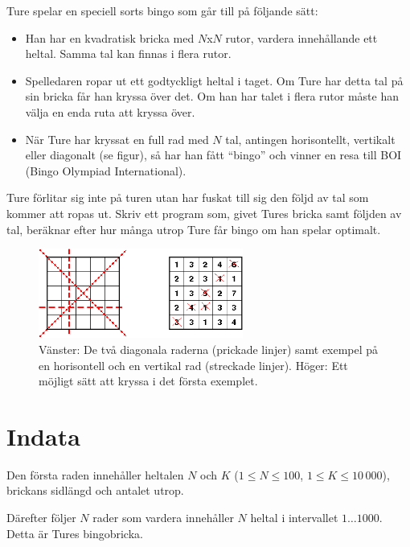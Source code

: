 
Ture spelar en speciell sorts bingo som går till på följande sätt:
\begin{itemize}
\item Han har en kvadratisk bricka med $N$x$N$ rutor, vardera innehållande ett heltal. Samma tal kan finnas i flera rutor.
\item Spelledaren ropar ut ett godtyckligt heltal i taget. Om Ture har detta tal på sin bricka får han kryssa över det. Om han har talet i flera rutor måste han välja en enda ruta att kryssa över.
\item När Ture har kryssat en full rad med $N$ tal, antingen horisontellt, vertikalt eller diagonalt (se figur), så har han fått ``bingo'' och vinner en resa till BOI (Bingo Olympiad International).
\end{itemize}

Ture förlitar sig inte på turen utan har fuskat till sig den följd av tal som kommer att ropas ut. Skriv ett program som, givet Tures bricka samt följden av tal, beräknar efter hur många utrop Ture får bingo om han spelar optimalt.

\begin{figure}[!h]
\begin{center}
\includegraphics[width=0.6\textwidth]{bingo.png}
\end{center}
\caption{Vänster: De två diagonala raderna (prickade linjer) samt
  exempel på en horisontell och en vertikal rad (streckade
  linjer). Höger: Ett möjligt sätt att kryssa i det första exemplet.}
\end{figure}



\section*{Indata}
Den första raden innehåller heltalen $N$ och $K$ ($1\leq N \leq 100$, $1 \leq K \leq 10\,000$), brickans
sidlängd och antalet utrop.

Därefter följer $N$ rader som vardera innehåller $N$ heltal i intervallet $1 \ldots 1000$. Detta är Tures bingobricka.


